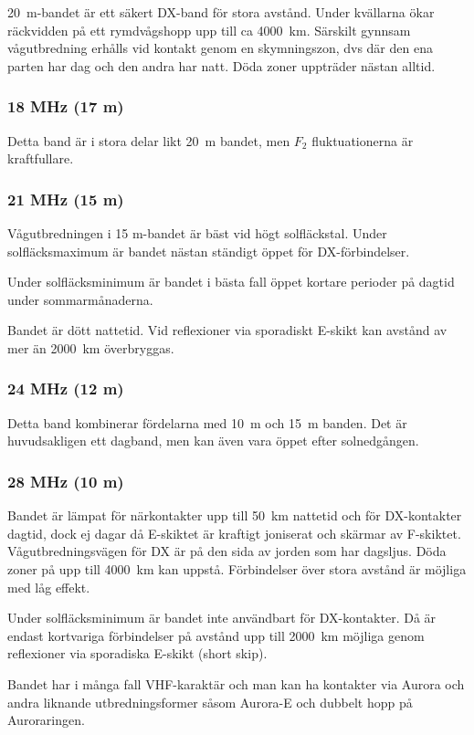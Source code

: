 20~m-bandet är ett säkert DX-band för stora avstånd.
Under kvällarna ökar räckvidden på ett rymdvågshopp upp till ca 4000~km.
Särskilt gynnsam vågutbredning erhålls vid kontakt genom en skymningszon, dvs
där den ena parten har dag och den andra har natt.
Döda zoner uppträder nästan alltid.

\subsubsection{18 MHz (17 m)}

Detta band är i stora delar likt 20~m bandet, men \(F_2\) fluktuationerna
är kraftfullare.

\subsubsection{21 MHz (15 m)}

Vågutbredningen i 15 m-bandet är bäst vid högt solfläckstal. Under
solfläcksmaximum är bandet nästan ständigt öppet för DX-förbindelser.

Under solfläcksminimum är bandet i bästa fall öppet kortare perioder
på dagtid under sommarmånaderna.

Bandet är dött nattetid. Vid reflexioner via sporadiskt E-skikt kan
avstånd av mer än 2000~km överbryggas.

\subsubsection{24 MHz (12 m)}

Detta band kombinerar fördelarna med 10~m och 15~m banden.
Det är huvudsakligen ett dagband, men kan även vara öppet efter
solnedgången.

\subsubsection{28 MHz (10 m)}

Bandet är lämpat för närkontakter upp till 50~km nattetid och för
DX-kontakter dagtid, dock ej dagar då E-skiktet är kraftigt joniserat
och skärmar av F-skiktet. Vågutbredningsvägen för DX är på den sida av
jorden som har dagsljus. Döda zoner på upp till 4000~km kan
uppstå. Förbindelser över stora avstånd är möjliga med låg effekt.

Under solfläcksminimum är bandet inte användbart för DX-kontakter. Då
är endast kortvariga förbindelser på avstånd upp till 2000~km möjliga
genom reflexioner via sporadiska E-skikt (short skip).

Bandet har i många fall VHF-karaktär och man kan ha kontakter via
Aurora och andra liknande utbredningsformer såsom Aurora-E och dubbelt
hopp på Auroraringen.
